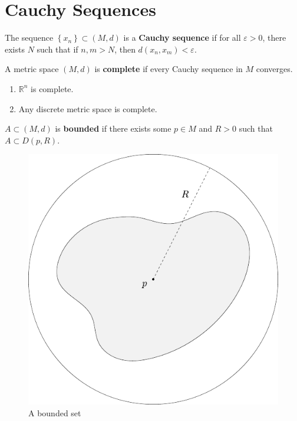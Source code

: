 \documentclass[twoside,10pt]{report}
\begin{document}
\section{Cauchy Sequences}

\begin{defn}[]
	The sequence $\left\{ x_n \right\}\subset (M,d)$ is a \textbf{Cauchy sequence} if for all $\varepsilon>0$, there exists $N$ such that if $n,m>N$, then $d(x_n,x_m) < \varepsilon$.
\end{defn}

\begin{defn}[]
	A metric space $(M,d)$ is \textbf{complete} if every Cauchy sequence in $M$ converges.
\end{defn}

\begin{ex}[]
	\begin{enumerate}
		\item $\mathbb{R}^n$ is complete.
		\item Any discrete metric space is complete.
	\end{enumerate}
\end{ex}

\begin{defn}[]
	$A \subset (M,d)$ is \textbf{bounded} if there exists some $p \in M$ and $R>0$ such that $A \subset D(p,R)$.
\end{defn}

\begin{figure}[H]
	\centering
	\includegraphics[scale=0.6]{fig/bounded.pdf}
	\caption{A bounded set}
\end{figure}
\end{document}
